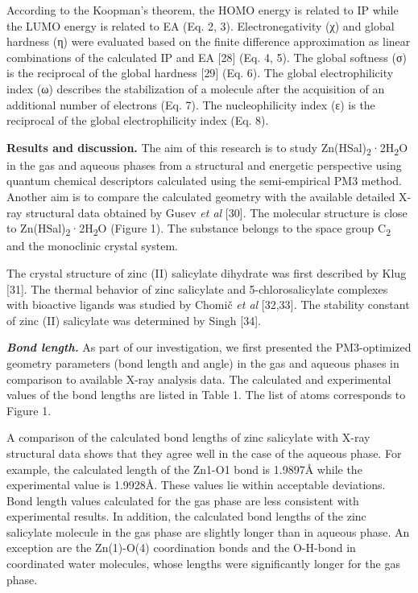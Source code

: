 \begin{multicols}{2}
According to the Koopman's theorem, the HOMO energy is related to IP
while the LUMO energy is related to EA (Eq. 2, 3). Electronegativity (χ)
and global hardness (η) were evaluated based on the finite difference
approximation as linear combinations of the calculated IP and EA
{[}28{]} (Eq. 4, 5). The global softness (σ) is the reciprocal of the
global hardness {[}29{]} (Eq. 6). The global electrophilicity index (ω)
describes the stabilization of a molecule after the acquisition of an
additional number of electrons (Eq. 7). The nucleophilicity index (ε) is
the reciprocal of the global electrophilicity index (Eq. 8).

{\bfseries Results and discussion.} The aim of this research is to study
Zn(HSal)\textsubscript{2}·2H\textsubscript{2}O in the gas and aqueous
phases from a structural and energetic perspective using quantum
chemical descriptors calculated using the semi-empirical PM3 method.
Another aim is to compare the calculated geometry with the available
detailed X-ray structural data obtained by Gusev \emph{et al} {[}30{]}.
The molecular structure is close to
Zn(HSal)\textsubscript{2}·2H\textsubscript{2}O (Figure 1). The substance
belongs to the space group C\textsubscript{2} and the monoclinic crystal
system.

The crystal structure of zinc (II) salicylate dihydrate was first
described by Klug {[}31{]}. The thermal behavior of zinc salicylate and
5-chlorosalicylate complexes with bioactive ligands was studied by
Chomič \emph{et al} {[}32,33{]}\emph{.} The stability constant of zinc
(II) salicylate was determined by Singh {[}34{]}.

{\bfseries \emph{Bond length.}} As part of our investigation, we first
presented the PM3-optimized geometry parameters (bond length and angle)
in the gas and aqueous phases in comparison to available X-ray analysis
data. The calculated and experimental values \hspace{0pt}\hspace{0pt}of
the bond lengths are listed in Table 1. The list of atoms corresponds to
Figure 1.

A comparison of the calculated bond lengths of zinc salicylate with
X-ray structural data shows that they agree well in the case of the
aqueous phase. For example, the calculated length of the Zn1-O1 bond is
1.9897Å while the experimental value is 1.9928Å. These values lie within
acceptable deviations. Bond length values
\hspace{0pt}\hspace{0pt}calculated for the gas phase are less consistent
with experimental results. In addition, the calculated bond lengths of
the zinc salicylate molecule in the gas phase are slightly longer than
in aqueous phase. An exception are the Zn(1)-O(4) coordination bonds and
the O-H-bond in coordinated water molecules, whose lengths were
significantly longer for the gas phase.


\end{multicols}
